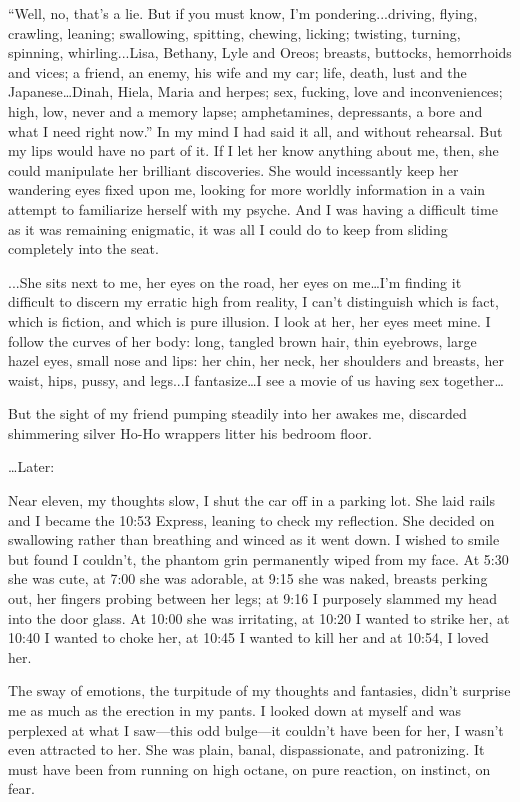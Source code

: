 ``Well, no, that's a lie. But if you must know, I'm pondering...driving,
flying, crawling, leaning; swallowing, spitting, chewing, licking;
twisting, turning, spinning, whirling...Lisa, Bethany, Lyle and Oreos;
breasts, buttocks, hemorrhoids and vices; a friend, an enemy, his wife
and my car; life, death, lust and the Japanese\ldots Dinah, Hiela, Maria
and herpes; sex, fucking, love and inconveniences; high, low, never and
a memory lapse; amphetamines, depressants, a bore and what I need right
now.'' In my mind I had said it all, and without rehearsal. But my lips
would have no part of it. If I let her know anything about me, then, she
could manipulate her brilliant discoveries. She would incessantly keep
her wandering eyes fixed upon me, looking for more worldly information
in a vain attempt to familiarize herself with my psyche. And I was
having a difficult time as it was remaining enigmatic, it was all I
could do to keep from sliding completely into the seat.

...She sits next to me, her eyes on the road, her eyes on me\ldots I'm
finding it difficult to discern my erratic high from reality, I can't
distinguish which is fact, which is fiction, and which is pure illusion.
I look at her, her eyes meet mine. I follow the curves of her body:
long, tangled brown hair, thin eyebrows, large hazel eyes, small nose
and lips: her chin, her neck, her shoulders and breasts, her waist,
hips, pussy, and legs...I fantasize\ldots I see a movie of us having sex
together\ldots{}

But the sight of my friend pumping steadily into her awakes me,
discarded shimmering silver Ho-Ho wrappers litter his bedroom floor.

\ldots Later:

Near eleven, my thoughts slow, I shut the car off in a parking lot. She
laid rails and I became the 10:53 Express, leaning to check my
reflection. She decided on swallowing rather than breathing and winced
as it went down. I wished to smile but found I couldn't, the phantom
grin permanently wiped from my face. At 5:30 she was cute, at 7:00 she
was adorable, at 9:15 she was naked, breasts perking out, her fingers
probing between her legs; at 9:16 I purposely slammed my head into the
door glass. At 10:00 she was irritating, at 10:20 I wanted to strike
her, at 10:40 I wanted to choke her, at 10:45 I wanted to kill her and
at 10:54, I loved her.

The sway of emotions, the turpitude of my thoughts and fantasies, didn't
surprise me as much as the erection in my pants. I looked down at myself
and was perplexed at what I saw---this odd bulge---it couldn't have been
for her, I wasn't even attracted to her. She was plain, banal,
dispassionate, and patronizing. It must have been from running on high
octane, on pure reaction, on instinct, on fear.

